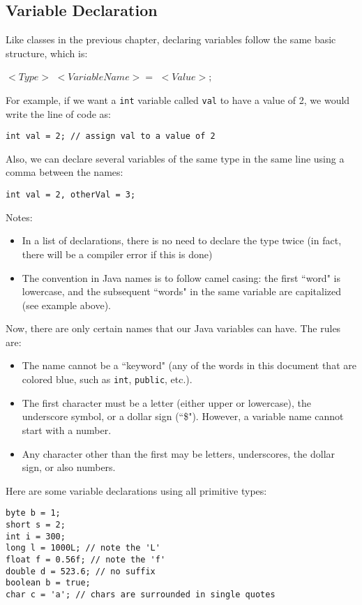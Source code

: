 \subsection{Variable Declaration}
Like classes in the previous chapter, declaring variables follow the same basic structure, which is:
\begin{center}
$<Type>$ $<VariableName> = $ $<Value>;$
\end{center}
For example, if we want a \verb|int| variable called \verb|val| to have a value of 2, we would write the line of code as:

\begin{lstlisting}
int val = 2; // assign val to a value of 2
\end{lstlisting}

\noindent Also, we can declare several variables of the same type in the same line using a comma between the names:
\begin{lstlisting}
int val = 2, otherVal = 3;
\end{lstlisting}
Notes: 
\begin{itemize}
\item In a list of declarations, there is no need to declare the type twice (in fact, there will be a compiler error if this is done)
\item The convention in Java names is to follow camel casing: the first ``word" is lowercase, and the subsequent ``words" in the same variable are capitalized (see example above).
\end{itemize}

\noindent Now, there are only certain names that our Java variables can have. The rules are:
\begin{itemize}
\item The name cannot be a ``keyword" (any of the words in this document that are colored blue, such as \verb|int|, \verb|public|, etc.).
\item The first character must be a letter (either upper or lowercase), the underscore symbol, or a dollar sign (``\$"). However, a variable name cannot start with a number. 
\item Any character other than the first may be letters, underscores, the dollar sign, or also numbers. 
\end{itemize}

\noindent Here are some variable declarations using all primitive types:
\begin{lstlisting}
byte b = 1;
short s = 2;
int i = 300;
long l = 1000L; // note the 'L'
float f = 0.56f; // note the 'f'
double d = 523.6; // no suffix
boolean b = true;
char c = 'a'; // chars are surrounded in single quotes
\end{lstlisting}

